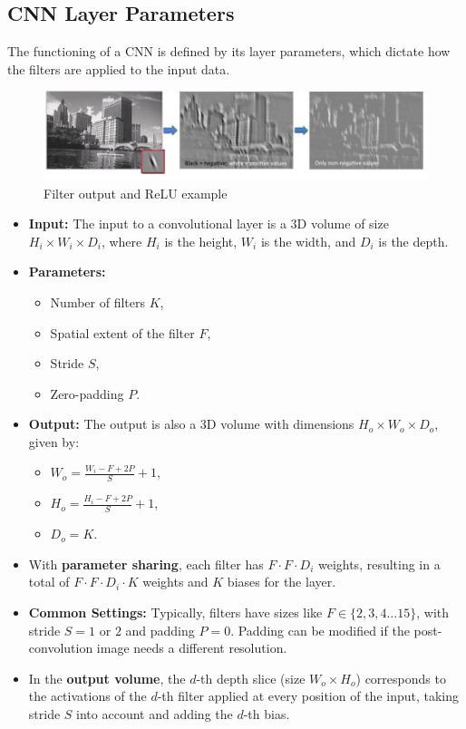 \subsection{CNN Layer Parameters}

The functioning of a CNN is defined by its layer parameters, which dictate how the filters are applied to the input data.

\begin{figure}[H]
    \centering
    \includegraphics[width=0.75\linewidth]{img/filter_example.png}
    \caption{Filter output and ReLU example}
    
\end{figure}

\begin{itemize}
    \item \textbf{Input:} The input to a convolutional layer is a 3D volume of size \( H_i \times W_i \times D_i \), where \( H_i \) is the height, \( W_i \) is the width, and \( D_i \) is the depth.
    \item \textbf{Parameters:}
    \begin{itemize}
        \item Number of filters \( K \),
        \item Spatial extent of the filter \( F \),
        \item Stride \( S \),
        \item Zero-padding \( P \).
    \end{itemize}
    \item \textbf{Output:} The output is also a 3D volume with dimensions \( H_o \times W_o \times D_o \), given by:
    \begin{itemize}
        \item \( W_o = \frac{W_i - F + 2P}{S} + 1 \),
        \item \( H_o = \frac{H_i - F + 2P}{S} + 1 \),
       
        \item \( D_o = K \).
    \end{itemize}
    \item With \textbf{parameter sharing}, each filter has \( F \cdot F \cdot D_i \) weights, resulting in a total of \( F \cdot F \cdot D_i \cdot K \) weights and \( K \) biases for the layer.
    \item \textbf{Common Settings:} Typically, filters have sizes like \( F \in \{ 2,3,4 \ldots 15\} \), with stride \( S = 1 \) or \( 2 \) and padding \( P  = 0\). Padding can be modified if the post-convolution image needs a different resolution.
    \item In the \textbf{output volume}, the \( d \)-th depth slice (size \( W_o \times H_o \)) corresponds to the activations of the \( d \)-th filter applied at every position of the input, taking stride \( S \) into account and adding the \( d \)-th bias.
\end{itemize}


